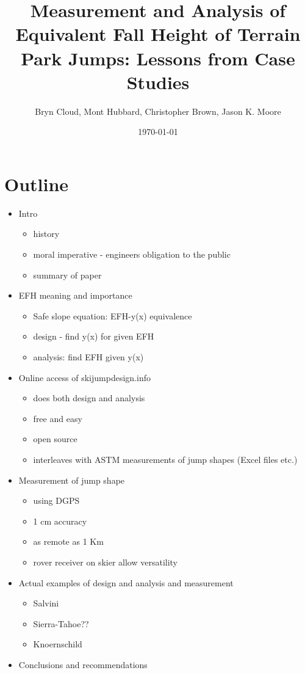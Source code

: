 \documentclass{article}
\title{Measurement and Analysis of Equivalent Fall Height of Terrain Park
  Jumps: Lessons from Case Studies}
\author{Bryn Cloud, Mont Hubbard, Christopher Brown, Jason K. Moore}
\date{\today}
\begin{document}
\maketitle

\section*{Outline}
%
\begin{itemize}
  \item Intro
  \begin{itemize}
    \item history
    \item moral imperative - engineers obligation to the public
    \item summary of paper
  \end{itemize}
  \item EFH meaning and importance
  \begin{itemize}
    \item Safe slope equation: EFH-y(x) equivalence
    \item design - find y(x) for given EFH
    \item analysis: find EFH given y(x)
  \end{itemize}
  \item Online access of skijumpdesign.info
  \begin{itemize}
    \item does both design and analysis
    \item free and easy
    \item open source
    \item interleaves with ASTM measurements of jump shapes (Excel files etc.)
  \end{itemize}
  \item Measurement of jump shape
  \begin{itemize}
    \item using DGPS
    \item 1 cm accuracy
    \item as remote as 1 Km
    \item rover receiver on skier allow versatility
  \end{itemize}
  \item Actual examples of design and analysis and measurement
  \begin{itemize}
    \item Salvini
    \item Sierra-Tahoe??
    \item Knoernschild
  \end{itemize}
  \item Conclusions and recommendations
\end{itemize}
\end{document}
